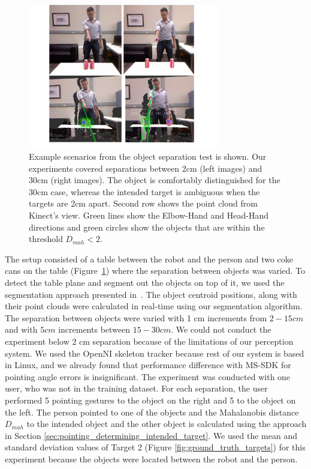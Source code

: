 \begin{figure}[ht!]
\centering
\includegraphics[width=0.75\textwidth]{pics/separation_2_cropped}
\caption{Example scenarios from the object separation test is shown. Our experiments covered separations between 2cm (left images) and 30cm (right images). The object is comfortably distinguished for the 30cm case, whereas the intended target is ambiguous when the targets are 2cm apart. Second row shows the point cloud from Kinect's view. Green lines show the Elbow-Hand and Head-Hand directions and green circles show the objects that are within the threshold $D_{mah}<2$.}
\label{fig:pointing_separation}
\end{figure}


The setup consisted of a table between the robot and the person and two coke cans on the table (Figure~\ref{fig:pointing_separation}) where the separation between objects was varied. To detect the table plane and segment out the objects on top of it, we used the segmentation approach presented in~\cite{trevor2013segmentation}. The object centroid positions, along with their point clouds were calculated in real-time using our segmentation algorithm. The separation between objects were varied with 1 cm increments from $2-15cm$ and with $5cm$ increments between $15-30 cm$. We could not conduct the experiment below 2 cm separation because of the limitations of our perception system. We used the OpenNI skeleton tracker because rest of our system is based in Linux, and we already found that performance difference with MS-SDK for pointing angle errors is insignificant. The experiment was conducted with one user, who was not in the training dataset. For each separation, the user performed 5 pointing gestures to the object on the right and 5 to the object on the left. The person pointed to one of the objects and the Mahalanobis distance $D_{mah}$ to the intended object and the other object is calculated using the approach in Section \ref{sec:pointing_determining_intended_target}. We used the mean and standard deviation values of Target 2 (Figure \ref{fig:ground_truth_targets}) for this experiment because the objects were located between the robot and the person.


